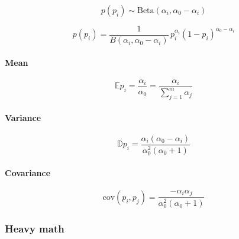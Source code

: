 \documentclass{article}
\newcommand{\expect}[1]{
	\mathbb{E} #1
}
\begin{document}
\begin{equation*}
p(p_i) \sim \textrm{Beta}(\alpha_i, \alpha_0 - \alpha_i)
\end{equation*}

\begin{equation}
p(p_i) = \frac{1}{B(\alpha_i, \alpha_0 - \alpha_i)} \, p_i^{\alpha_i} (1 - p_i)^{\alpha_0 - \alpha_i}
\end{equation}

\paragraph{Mean}
\begin{equation}
\expect{p_i} = \frac{\alpha_i}{\alpha_0} = \frac{\alpha_i}{\sum\limits_{j=1}^m{\alpha_j}}
\end{equation}

\paragraph{Variance}
\begin{equation}
\mathbb{D}{p_i} = \frac{\alpha_i(\alpha_0 - \alpha_i)}{\alpha_0^2(\alpha_0 + 1)}
\end{equation}

\paragraph{Covariance}
\begin{equation}
\textrm{cov}(p_i, p_j) = \frac{-\alpha_i\alpha_j}{\alpha_0^2(\alpha_0 + 1)}
\end{equation}

\subsubsection{Heavy math}
\end{document}
